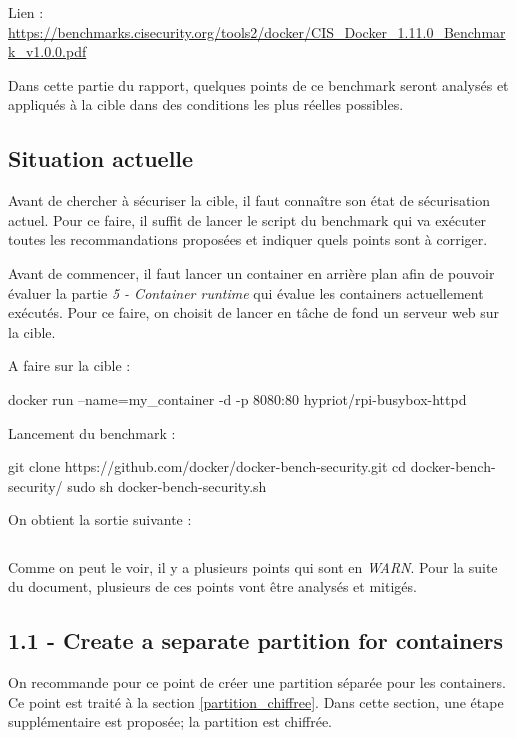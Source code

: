\documentclass[11pt,a4paper,oneside]{report}
\begin{document}
Lien : \url{https://benchmarks.cisecurity.org/tools2/docker/CIS_Docker_1.11.0_Benchmark_v1.0.0.pdf}

Dans cette partie du rapport, quelques points de ce benchmark seront analysés et appliqués à la cible dans des conditions les plus réelles possibles.

\subsection{Situation actuelle}
Avant de chercher à sécuriser la cible, il faut connaître son état de sécurisation actuel. Pour ce faire, il suffit de lancer le script du benchmark qui va exécuter toutes les recommandations proposées et indiquer quels points sont à corriger.

Avant de commencer, il faut lancer un container en arrière plan afin de pouvoir évaluer la partie \textit{5 - Container runtime} qui évalue les containers actuellement exécutés. Pour ce faire, on choisit de lancer en tâche de fond un serveur web sur la cible.

A faire sur la cible :
\begin{bashcode}
docker run --name=my_container -d -p 8080:80 hypriot/rpi-busybox-httpd
\end{bashcode}

Lancement du benchmark :
\begin{bashcode}
git clone https://github.com/docker/docker-bench-security.git
cd docker-bench-security/
sudo sh docker-bench-security.sh
\end{bashcode}

On obtient la sortie suivante :

\inputminted[xleftmargin=20pt, linenos=true, breaklines=true, frame=single, framesep=6pt, tabsize=2, fontfamily=courier, fontsize=\small]{text}{../../docker_security_benchmark/vanilla.log}


Comme on peut le voir, il y a plusieurs points qui sont en \textit{WARN}. Pour la suite du document, plusieurs de ces points vont être analysés et mitigés.


\subsection{1.1  - Create a separate partition for containers}
On recommande pour ce point de créer une partition séparée pour les containers. Ce point est traité à la section \ref{partition_chiffree}. Dans cette section, une étape supplémentaire est proposée; la partition est chiffrée.
\end{document}
